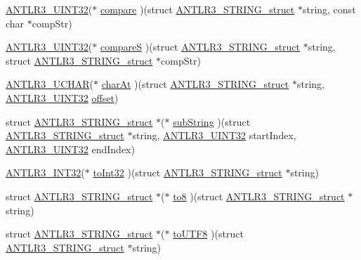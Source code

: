 \begin{DoxyCompactItemize}
\item 
\hyperlink{antlr3defs_8h_ac41f744abd0fd25144b9eb9d11b1dfd1}{A\-N\-T\-L\-R3\-\_\-\-U\-I\-N\-T32}($\ast$ \hyperlink{struct_a_n_t_l_r3___s_t_r_i_n_g__struct_a66df83929ed437295facf03e6cc72c4d}{compare} )(struct \hyperlink{struct_a_n_t_l_r3___s_t_r_i_n_g__struct}{A\-N\-T\-L\-R3\-\_\-\-S\-T\-R\-I\-N\-G\-\_\-struct} $\ast$string, const char $\ast$comp\-Str)
\item 
\hyperlink{antlr3defs_8h_ac41f744abd0fd25144b9eb9d11b1dfd1}{A\-N\-T\-L\-R3\-\_\-\-U\-I\-N\-T32}($\ast$ \hyperlink{struct_a_n_t_l_r3___s_t_r_i_n_g__struct_a5904beec2286c167a63ac20592a121cb}{compare\-S} )(struct \hyperlink{struct_a_n_t_l_r3___s_t_r_i_n_g__struct}{A\-N\-T\-L\-R3\-\_\-\-S\-T\-R\-I\-N\-G\-\_\-struct} $\ast$string, struct \hyperlink{struct_a_n_t_l_r3___s_t_r_i_n_g__struct}{A\-N\-T\-L\-R3\-\_\-\-S\-T\-R\-I\-N\-G\-\_\-struct} $\ast$comp\-Str)
\item 
\hyperlink{antlr3defs_8h_a078eec1343cdbb862af80f352ea701da}{A\-N\-T\-L\-R3\-\_\-\-U\-C\-H\-A\-R}($\ast$ \hyperlink{struct_a_n_t_l_r3___s_t_r_i_n_g__struct_a28a8d25f91f1285dfbb9e13ab9bfef50}{char\-At} )(struct \hyperlink{struct_a_n_t_l_r3___s_t_r_i_n_g__struct}{A\-N\-T\-L\-R3\-\_\-\-S\-T\-R\-I\-N\-G\-\_\-struct} $\ast$string, \hyperlink{antlr3defs_8h_ac41f744abd0fd25144b9eb9d11b1dfd1}{A\-N\-T\-L\-R3\-\_\-\-U\-I\-N\-T32} \hyperlink{qmb_8m_a4dd6f73f98b7876577fd0d041b94d968}{offset})
\item 
struct \hyperlink{struct_a_n_t_l_r3___s_t_r_i_n_g__struct}{A\-N\-T\-L\-R3\-\_\-\-S\-T\-R\-I\-N\-G\-\_\-struct} $\ast$($\ast$ \hyperlink{struct_a_n_t_l_r3___s_t_r_i_n_g__struct_aa8f19ad943805160828b2fcc8f52725e}{sub\-String} )(struct \hyperlink{struct_a_n_t_l_r3___s_t_r_i_n_g__struct}{A\-N\-T\-L\-R3\-\_\-\-S\-T\-R\-I\-N\-G\-\_\-struct} $\ast$string, \hyperlink{antlr3defs_8h_ac41f744abd0fd25144b9eb9d11b1dfd1}{A\-N\-T\-L\-R3\-\_\-\-U\-I\-N\-T32} start\-Index, \hyperlink{antlr3defs_8h_ac41f744abd0fd25144b9eb9d11b1dfd1}{A\-N\-T\-L\-R3\-\_\-\-U\-I\-N\-T32} end\-Index)
\item 
\hyperlink{antlr3defs_8h_a6faef5c4687f8eb633d2aefea93973ca}{A\-N\-T\-L\-R3\-\_\-\-I\-N\-T32}($\ast$ \hyperlink{struct_a_n_t_l_r3___s_t_r_i_n_g__struct_a9aa39586e4398f80741d15fb2792c8f2}{to\-Int32} )(struct \hyperlink{struct_a_n_t_l_r3___s_t_r_i_n_g__struct}{A\-N\-T\-L\-R3\-\_\-\-S\-T\-R\-I\-N\-G\-\_\-struct} $\ast$string)
\item 
struct \hyperlink{struct_a_n_t_l_r3___s_t_r_i_n_g__struct}{A\-N\-T\-L\-R3\-\_\-\-S\-T\-R\-I\-N\-G\-\_\-struct} $\ast$($\ast$ \hyperlink{struct_a_n_t_l_r3___s_t_r_i_n_g__struct_aec4caa47ade2654087cfab84e752f4b4}{to8} )(struct \hyperlink{struct_a_n_t_l_r3___s_t_r_i_n_g__struct}{A\-N\-T\-L\-R3\-\_\-\-S\-T\-R\-I\-N\-G\-\_\-struct} $\ast$string)
\item 
struct \hyperlink{struct_a_n_t_l_r3___s_t_r_i_n_g__struct}{A\-N\-T\-L\-R3\-\_\-\-S\-T\-R\-I\-N\-G\-\_\-struct} $\ast$($\ast$ \hyperlink{struct_a_n_t_l_r3___s_t_r_i_n_g__struct_a2ec377c0e2e1b07e4f5772f946d49b87}{to\-U\-T\-F8} )(struct \hyperlink{struct_a_n_t_l_r3___s_t_r_i_n_g__struct}{A\-N\-T\-L\-R3\-\_\-\-S\-T\-R\-I\-N\-G\-\_\-struct} $\ast$string)
\end{DoxyCompactItemize}


